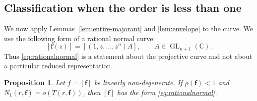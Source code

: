 \documentclass[12pt,letterpaper,reqno]{amsart}
\newtheorem{prop}[thm]{Proposition}
\theoremstyle{definition}
\numberwithin{equation}{section}
\newcommand{\C}{\mathbb C}
\newcommand{\fv}{\bm f}
\begin{document}
\subsection{Classification when the order is less than one}

We now apply Lemmas~\ref{lem:entire-majorant} and
\ref{lem:envelope} to the curve. We use the following form of a
rational normal curve:
\begin{equation}\label{eq:rationalnormal}
 [\fv(z)]
 =
 [(1,z,\ldots,z^{n})A],
 \qquad
 A\in\operatorname{GL}_{n+1}(\C).
\end{equation}
Thus \eqref{eq:rationalnormal} is a statement about the projective
curve and not about a particular reduced representation.

\begin{prop}\label{prop:small-order}
Let \(f=[\fv]\) be linearly non-degenerate. If \(\rho(\fv)<1\) and
\(N_1(r,\fv)=o(T(r,\fv))\), then \([\fv]\) has the form
\eqref{eq:rationalnormal}.
\end{prop}
\end{document}
